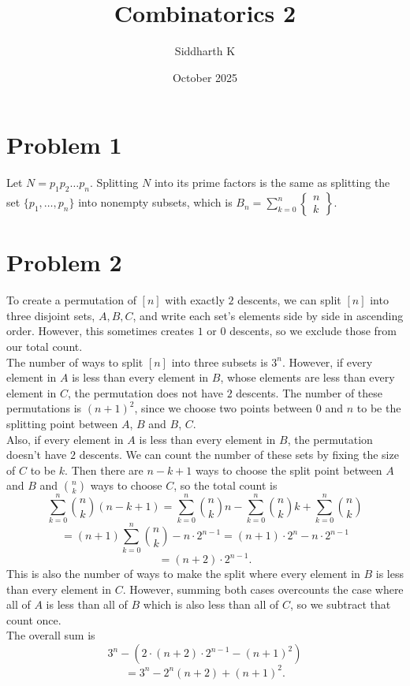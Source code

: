 \documentclass{article}
\title{Combinatorics 2}
\author{Siddharth K}
\date{October 2025}
\newcommand{\sstirling}[2]
    {\left\{
    \begin{matrix}
        #1 \\
        #2
    \end{matrix}
    \right\}}
\begin{document}
\maketitle

\section*{Problem 1}
Let $N = p_1p_2\ldots p_n$. Splitting $N$ into its prime factors is the same as splitting the set $\{p_1, \ldots, p_n\}$ into nonempty subsets, which is $B_n = \sum_{k = 0}^n \sstirling{n}{k}$.

\section*{Problem 2}
To create a permutation of $[n]$ with exactly $2$ descents, we can split $[n]$ into three disjoint sets, $A, B, C$, and write each set's elements side by side in ascending order. However, this sometimes creates $1$ or $0$ descents, so we exclude those from our total count. \\

The number of ways to split $[n]$ into three subsets is $3^n$. However, if every element in $A$ is less than every element in $B$, whose elements are less than every element in $C$, the permutation does not have $2$ descents. The number of these permutations is $(n + 1)^2$, since we choose two points between $0$ and $n$ to be the splitting point between $A$, $B$ and $B$, $C$. \\

Also, if every element in $A$ is less than every element in $B$, the permutation doesn't have $2$ descents. We can count the number of these sets by fixing the size of $C$ to be $k$. Then there are $n - k + 1$ ways to choose the split point between $A$ and $B$ and $\binom nk$ ways to choose $C$, so the total count is
$$\sum_{k = 0}^n \binom nk (n - k + 1) = \sum_{k = 0}^n \binom nk n - \sum_{k = 0}^n \binom nk k + \sum_{k = 0}^n \binom nk$$
$$= (n + 1)\sum_{k = 0}^n \binom nk - n\cdot 2^{n - 1} = (n + 1)\cdot 2^n - n\cdot 2^{n - 1}$$
$$= (n + 2)\cdot 2^{n - 1}.$$
This is also the number of ways to make the split where every element in $B$ is less than every element in $C$. However, summing both cases overcounts the case where all of $A$ is less than all of $B$ which is also less than all of $C$, so we subtract that count once. \\

The overall sum is
$$3^n - (2\cdot (n + 2)\cdot 2^{n - 1} - (n + 1)^2)$$
$$= 3^n - 2^n(n + 2) + (n + 1)^2.$$
\end{document}

